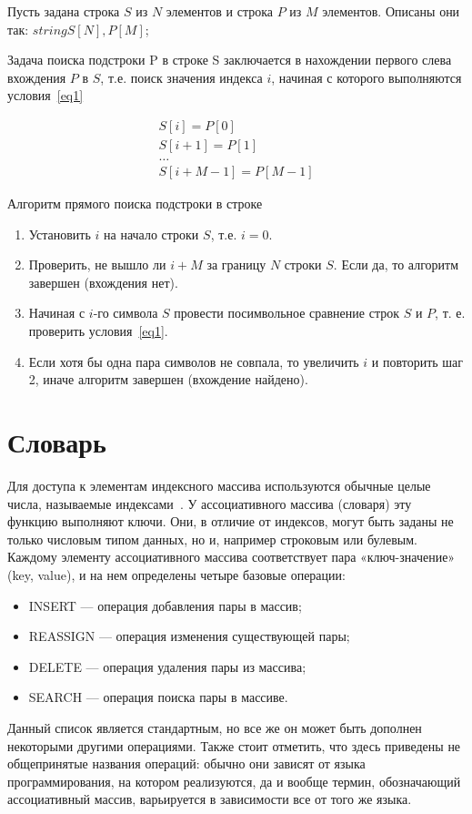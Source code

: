 Пусть задана строка $S$ из $N$ элементов и строка $P$ из $M$ элементов. Описаны они так: $string S[N], P[M]$;

Задача поиска подстроки P в строке S заключается в нахождении первого слева вхождения $P$ в $S$, т.е. поиск значения индекса $i$, начиная с которого выполняются условия~\eqref{eq1}

\begin{equation}\label{eq1}
	\begin{array}{cc}
		S[i] = P[0] \\
		S[i + 1] = P[1] \\
		\ldots \\
		S[i + M - 1] = P[M - 1]
	\end{array}
\end{equation}

Алгоритм прямого поиска подстроки в строке
\begin{enumerate}
	\item Установить $i$ на начало строки $S$, т.е. $i = 0$.
	\item Проверить, не вышло ли $i + M$ за границу $N$ строки $S$. Если да, то алгоритм завершен (вхождения нет).
	\item Начиная с $i$-го символа $S$ провести посимвольное сравнение строк $S$ и $P$, т. е. проверить условия~\eqref{eq1}.
	\item Если хотя бы одна пара символов не совпала, то увеличить $i$ и повторить шаг 2, иначе 
	алгоритм завершен (вхождение найдено).
\end{enumerate}

\section{Словарь}

Для доступа к элементам индексного массива используются обычные целые числа, называемые индексами~\cite{dictionary}. У ассоциативного массива (словаря) эту функцию выполняют ключи. Они, в отличие от индексов, могут быть заданы не только числовым типом данных, но и, например строковым или булевым. Каждому элементу ассоциативного массива соответствует пара «ключ-значение» (key, value), и на нем определены четыре базовые операции:
\begin{itemize}
\item INSERT --- операция добавления пары в массив;
\item REASSIGN --- операция изменения существующей пары;
\item DELETE --- операция удаления пары из массива;
\item SEARCH --- операция поиска пары в массиве.
\end{itemize}
Данный список является стандартным, но все же он может быть дополнен некоторыми другими операциями. Также стоит отметить, что здесь приведены не общепринятые названия операций: обычно они зависят от языка программирования, на котором реализуются, да и вообще термин, обозначающий ассоциативный массив, варьируется в зависимости все от того же языка. 

